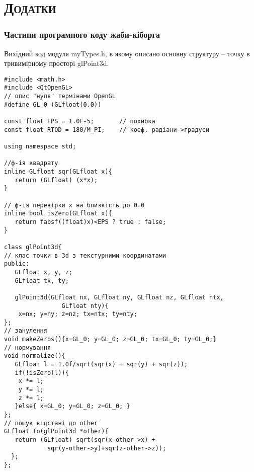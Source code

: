 

\chapter*{\textsc{Додатки}}

\subsection*{Частини програмного коду жаби-кіборга}
Вихідний код модуля myTypes.h, в якому описано основну структуру -- точку в тривимірному просторі glPoint3d.
\begin{verbatim}
#include <math.h>
#include <QtOpenGL>
// опис "нуля" термінами OpenGL
#define GL_0 (GLfloat(0.0))

const float EPS = 1.0E-5;		// похибкa 
const float RTOD = 180/M_PI;	// коеф. радіани->градуси

using namespace std;

//ф-ія квадрату
inline GLfloat sqr(GLfloat x){ 
   return (GLfloat) (x*x); 
}  

// ф-ія перевірки x на близкість до 0.0
inline bool isZero(GLfloat x){ 
   return fabsf((float)x)<EPS ? true : false; 
}

class glPoint3d{
// клас точки в 3d з текстурними координатами
public:
   GLfloat x, y, z;
   GLfloat tx, ty;

   glPoint3d(GLfloat nx, GLfloat ny, GLfloat nz, GLfloat ntx, 
   				GLfloat nty){
    x=nx; y=ny; z=nz; tx=ntx; ty=nty;
};  
// занулення
void makeZeros(){x=GL_0; y=GL_0; z=GL_0; tx=GL_0; ty=GL_0;}
// нормування
void normalize(){
   GLfloat l = 1.0f/sqrt(sqr(x) + sqr(y) + sqr(z));
   if(!isZero(l)){
    x *= l;
    y *= l;
    z *= l;
   }else{ x=GL_0; y=GL_0; z=GL_0; }
};
// пошук відстані до other
GLfloat to(glPoint3d *other){ 
   return (GLfloat) sqrt(sqr(x-other->x) + 
            sqr(y-other->y)+sqr(z-other->z)); 
  };
};
\end{verbatim}